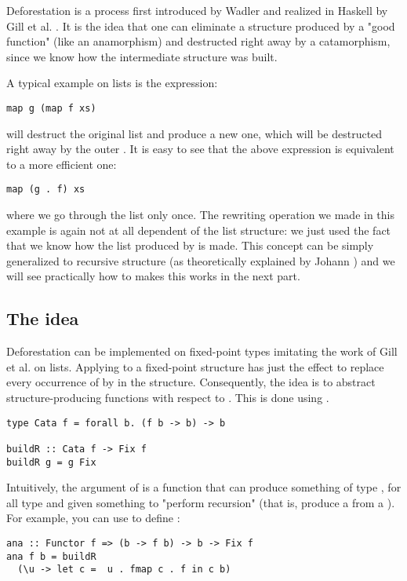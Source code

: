 
Deforestation is a process first introduced by Wadler \cite{WADLER1990231} and realized in Haskell by Gill et al. \cite{Gill:1993:SCD:165180.165214}. It is the idea that one can eliminate a structure produced by a "good function" (like an anamorphism) and destructed right away by a catamorphism, since we know how the intermediate structure was built.

A typical example on lists is the expression:
\begin{verbatim}
map g (map f xs)
\end{verbatim}
 will destruct the original list and produce a new one, which will be destructed right away by the outer . It is easy to see that the above expression is equivalent to a more efficient one:
\begin{verbatim}
map (g . f) xs
\end{verbatim}
\noindent where we go through the list only once.
The rewriting operation we made in this example is again not at all dependent of the list structure: we just used the fact that we know how the list produced by  is made. This concept can be simply generalized to recursive structure (as theoretically explained by Johann \cite{Johann:2002:GSF:641433.641471}) and we will see practically how to makes this works in the next part.

\subsection{The idea}
Deforestation can be implemented on fixed-point types imitating the work of Gill et al. \cite{Gill:1993:SCD:165180.165214} on lists. Applying  to a fixed-point structure has just the effect to replace every occurrence of  by  in the structure. Consequently, the idea is to abstract structure-producing functions with respect to . This is done using .

\begin{verbatim}
type Cata f = forall b. (f b -> b) -> b

buildR :: Cata f -> Fix f
buildR g = g Fix
\end{verbatim}

\noindent Intuitively, the argument of  is a function that  can produce something of type , for all type  and given something to "perform recursion" (that is, produce a  from a ). For example, you can use  to define :
\begin{verbatim}
ana :: Functor f => (b -> f b) -> b -> Fix f
ana f b = buildR
  (\u -> let c =  u . fmap c . f in c b)
\end{verbatim}

